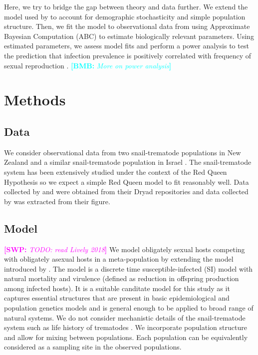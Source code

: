 \documentclass{article}\usepackage[]{graphicx}\usepackage[]{color}
\newcommand{\comment}[3]{\textcolor{#1}{\textbf{[#2: }\textit{#3}\textbf{]}}}
\newcommand{\bmb}[1]{\comment{cyan}{BMB}{#1}}
\newcommand{\swp}[1]{\comment{magenta}{SWP}{#1}}
\begin{document}
Here, we try to bridge the gap between theory and data further.
We extend the model used by \cite{lively2010epidemiological} to account for demographic stochasticity and simple population structure.
Then, we fit the model to observational data from \cite{dagan2013clonal, mckone2016fine, vergara2014infection} using Approximate Bayesian Computation (ABC) to estimate biologically relevant parameters.
Using estimated parameters, we assess model fits and perform a power analysis to test the prediction that infection prevalence is positively correlated with frequency of sexual reproduction \cite{lively2001trematode}.
\bmb{More on power analysis}

\section{Methods}

\subsection{Data}

We consider observational data from two snail-trematode populations in New Zealand \citep{vergara2014infection, mckone2016fine} and a similar snail-trematode population in Israel \citep{dagan2013clonal}. 
The snail-trematode system has been extensively studied under the context of the Red Queen Hypothesis so we expect a simple Red Queen model to fit reasonably well.
Data collected by \cite{dagan2013clonal} and \cite{vergara2014infection} were obtained from their Dryad repositories \citep{dryad_f5t56, dryad_29nk3_2} and data collected by \cite{mckone2016fine} was extracted from their figure.

\subsection{Model}

\swp{TODO: read Lively 2018}
We model obligately sexual hosts competing with obligately asexual hosts in a meta-population by extending the model introduced by \cite{lively2010epidemiological}.
The model is a discrete time susceptible-infected (SI) model with natural mortality and virulence (defined as reduction in offspring production among infected hosts).
It is a suitable canditate model for this study as it captures essential structures that are present in basic epidemiological and population genetics models and is general enough to be applied to broad range of natural systems.
We do not consider mechanistic details of the snail-trematode system such as life history of trematodes \citep{vergara2014infection}.
We incorporate population structure and allow for mixing between populations.
Each population can be equivalently considered as a sampling site in the observed populations.
\end{document}
